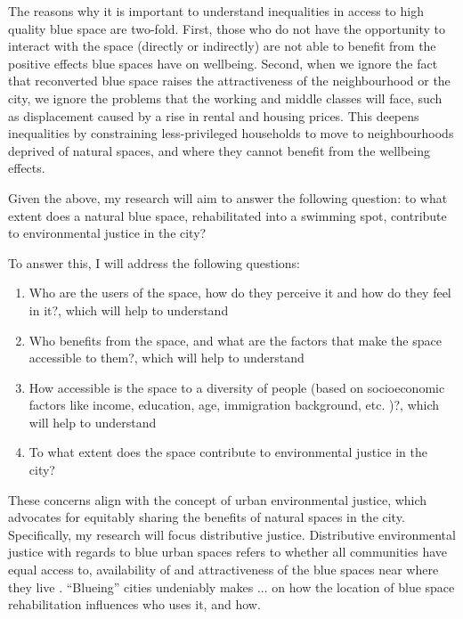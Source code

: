 \documentclass{article}
\begin{document}
The reasons why it is important to understand inequalities in access to high quality blue space are two-fold. 
First, those who do not have the opportunity to interact with the space (directly or indirectly) are not able to benefit from the positive effects blue spaces have on wellbeing. %
Second, when we ignore the fact that reconverted blue space raises the attractiveness of the neighbourhood or the city, we ignore the problems that the working and middle classes will face, such as displacement caused by a rise in rental and housing prices. This deepens inequalities by constraining less-privileged households to move to neighbourhoods deprived of natural spaces, and where they cannot benefit from the wellbeing effects.

Given the above, my research will aim to answer the following question: to what extent does a natural blue space, rehabilitated into a swimming spot, contribute to environmental justice in the city?

To answer this, I will address the following questions:

\begin{enumerate}
	\item Who are the users of the space, how do they perceive it and how do they feel in it?, which will help to understand
	\item Who benefits from the space, and what are the factors that make the space accessible to them?, which will help to understand
	\item How accessible is the space to a diversity of people (based on socioeconomic factors like income, education, age, immigration background, etc. \parencite{baro2021school})?, which will help to understand
	\item To what extent does the space contribute to environmental justice in the city?
\end{enumerate}


These concerns align with the concept of urban environmental justice, which advocates for equitably sharing the benefits of natural spaces  in the city. Specifically, my research will focus distributive justice. Distributive environmental justice with regards to blue urban spaces refers to whether all communities have equal access to, availability of and attractiveness of the blue spaces near where they live \parencite{kronenberg2020environmental}. 
``Blueing'' cities undeniably makes ...
 on how the location of blue space rehabilitation influences who uses it, and how.
\end{document}
